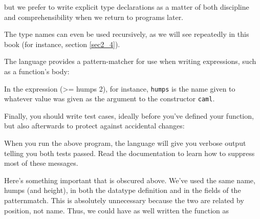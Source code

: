 \noindent
but we prefer to write explicit type declarations as a matter of both discipline
and comprehensibility when we return to programs later.

The type names can even be used recursively, as we will see repeatedly in this
book (for instance, section \ref{sec2_4}).

The language provides a pattern-matcher for use when writing expressions, such
as a function’s body:


\noindent
In the expression  (>= humps 2), for instance,
\verb|humps| is the name given to whatever value was given as the argument to
the constructor  \verb|caml|.

Finally, you should write test cases, ideally before you’ve defined your
function, but also afterwards to protect against accidental changes:


\noindent
When you run the above program, the language will give you verbose output telling
you both tests passed.
Read the documentation to learn how to suppress most of these messages.

Here’s something important that is obscured above.
We’ve used the same name,
humps (and height), in both the datatype definition and in the fields of the
patternmatch.
This is absolutely unnecessary because the two are related by position, not
name.
Thus, we could have as well written the function as

